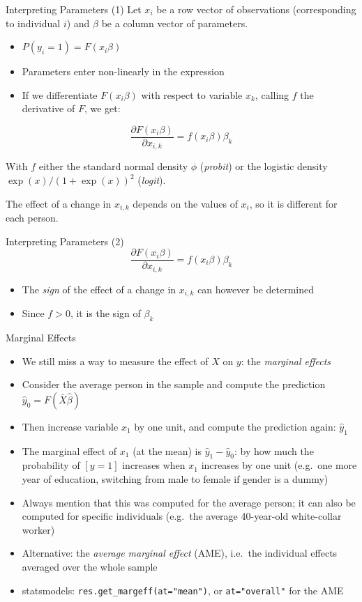 \documentclass[aspectratio=169]{beamer}
\begin{document}
\begin{frame}{Interpreting Parameters (1)}
Let $x_i$ be a row vector of observations (corresponding to individual $i$) and $\beta$ be a column vector of parameters.

\begin{itemize}
    \item $P(y_i = 1) = F(x_i\beta)$
    \item Parameters enter non-linearly in the expression
    \item If we differentiate $F(x_i\beta)$ with respect to variable $x_k$, calling $f$ the derivative of $F$, we get:
\end{itemize}

\[\frac{\partial F(x_i\beta)}{\partial x_{i,k}} = f(x_i\beta)\beta_k\]

With $f$ either the standard normal density $\phi$ (\textit{probit}) or the logistic density $\exp(x)/(1+\exp(x))^2$ (\textit{logit}).

The effect of a change in $x_{i,k}$ depends on the values of $x_i$, so it is different for each person.
\end{frame}

\begin{frame}{Interpreting Parameters (2)}
\[\frac{\partial F(x_i\beta)}{\partial x_{i,k}} = f(x_i\beta)\beta_k\]

\begin{itemize}
    \item The \textit{sign} of the effect of a change in $x_{i,k}$ can however be determined
    \item Since $f > 0$, it is the sign of $\beta_k$
\end{itemize}
\end{frame}

\begin{frame}{Marginal Effects}
\begin{itemize}
    \item We still miss a way to measure the effect of $X$ on $y$: the \textit{marginal effects}
    \item Consider the average person in the sample and compute the prediction $\hat{y}_0 = F(\bar{X}\hat{\beta})$
    \item Then increase variable $x_1$ by one unit, and compute the prediction again: $\hat{y}_1$
    \item The marginal effect of $x_1$ (at the mean) is $\hat{y}_1 - \hat{y}_0$: by how much the probability of $[y = 1]$ increases when $x_1$ increases by one unit (e.g.\ one more year of education, switching from male to female if gender is a dummy)
    \item Always mention that this was computed for the average person; it can also be computed for specific individuals (e.g.\ the average 40-year-old white-collar worker)
    \item Alternative: the \textit{average marginal effect} (AME), i.e.\ the individual effects averaged over the whole sample
    \item statsmodels: \texttt{res.get\_margeff(at="mean")}, or \texttt{at="overall"} for the AME
\end{itemize}
\end{frame}
\end{document}
